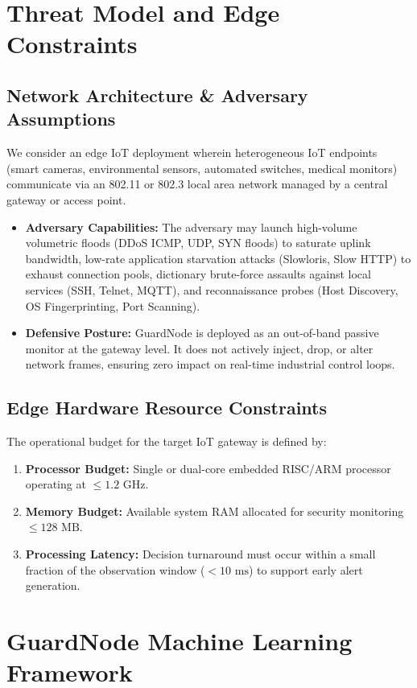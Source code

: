 \documentclass[conference]{IEEEtran}
\begin{document}
\section{Threat Model and Edge Constraints}

\subsection{Network Architecture & Adversary Assumptions}
We consider an edge IoT deployment wherein heterogeneous IoT endpoints (smart cameras, environmental sensors, automated switches, medical monitors) communicate via an 802.11 or 802.3 local area network managed by a central gateway or access point.
\begin{itemize}
    \item \textbf{Adversary Capabilities:} The adversary may launch high-volume volumetric floods (DDoS ICMP, UDP, SYN floods) to saturate uplink bandwidth, low-rate application starvation attacks (Slowloris, Slow HTTP) to exhaust connection pools, dictionary brute-force assaults against local services (SSH, Telnet, MQTT), and reconnaissance probes (Host Discovery, OS Fingerprinting, Port Scanning).
    \item \textbf{Defensive Posture:} GuardNode is deployed as an out-of-band passive monitor at the gateway level. It does not actively inject, drop, or alter network frames, ensuring zero impact on real-time industrial control loops.
\end{itemize}

\subsection{Edge Hardware Resource Constraints}
The operational budget for the target IoT gateway is defined by:
\begin{enumerate}
    \item \textbf{Processor Budget:} Single or dual-core embedded RISC/ARM processor operating at $\le 1.2\text{ GHz}$.
    \item \textbf{Memory Budget:} Available system RAM allocated for security monitoring $\le 128\text{ MB}$.
    \item \textbf{Processing Latency:} Decision turnaround must occur within a small fraction of the observation window ($< 10\text{ ms}$) to support early alert generation.
\end{enumerate}

\section{GuardNode Machine Learning Framework}
\end{document}
